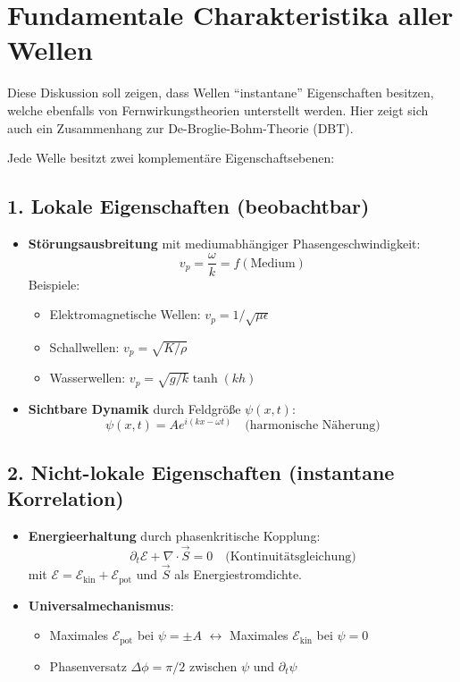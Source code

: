 \newpage
\section{Fundamentale Charakteristika aller Wellen}
Diese Diskussion soll zeigen, dass Wellen \enquote{instantane} Eigenschaften besitzen, welche ebenfalls von Fernwirkungstheorien unterstellt werden.
Hier zeigt sich auch ein Zusammenhang zur De-Broglie-Bohm-Theorie (DBT).

Jede Welle besitzt zwei komplementäre Eigenschaftsebenen:

\subsection*{1. Lokale Eigenschaften (beobachtbar)}
\begin{itemize}
    \item \textbf{Störungsausbreitung} mit mediumabhängiger Phasengeschwindigkeit:
    \[
    v_p = \frac{\omega}{k} = f(\text{Medium})
    \]
    Beispiele:
    \begin{itemize}
        \item Elektromagnetische Wellen: $v_p = 1/\sqrt{\mu\epsilon}$
        \item Schallwellen: $v_p = \sqrt{K/\rho}$
        \item Wasserwellen: $v_p = \sqrt{g/k} \tanh(kh)$
    \end{itemize}
    
    \item \textbf{Sichtbare Dynamik} durch Feldgröße $\psi(x,t)$:
    \[
    \psi(x,t) = A e^{i(kx-\omega t)} \quad \text{(harmonische Näherung)}
    \]
\end{itemize}

\subsection*{2. Nicht-lokale Eigenschaften (instantane Korrelation)}
\begin{itemize}
    \item \textbf{Energieerhaltung} durch phasenkritische Kopplung:
    \[
    \partial_t \mathcal{E} + \nabla \cdot \vec{S} = 0 \quad \text{(Kontinuitätsgleichung)}
    \]
    mit $\mathcal{E} = \mathcal{E}_\text{kin} + \mathcal{E}_\text{pot}$ und $\vec{S}$ als Energiestromdichte.
    
    \item \textbf{Universalmechanismus}:
    \begin{itemize}
        \item Maximales $\mathcal{E}_\text{pot}$ bei $\psi = \pm A$ $\leftrightarrow$ Maximales $\mathcal{E}_\text{kin}$ bei $\psi = 0$
        \item Phasenversatz $\Delta\phi = \pi/2$ zwischen $\psi$ und $\partial_t\psi$
    \end{itemize}
\end{itemize}

